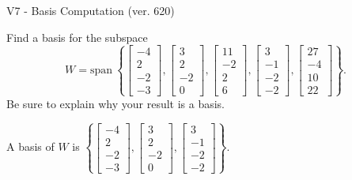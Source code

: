 \begin{exercise}
  \begin{exerciseTitle}V7 - Basis Computation (ver. 620)\end{exerciseTitle}
  \begin{exerciseStatement}
    Find a basis for the subspace 
\[W=\mathrm{span}\ \left\{\left[\begin{array}{r}
-4 \\
2 \\
-2 \\
-3
\end{array}\right] , \left[\begin{array}{r}
3 \\
2 \\
-2 \\
0
\end{array}\right] , \left[\begin{array}{r}
11 \\
-2 \\
2 \\
6
\end{array}\right] , \left[\begin{array}{r}
3 \\
-1 \\
-2 \\
-2
\end{array}\right] , \left[\begin{array}{r}
27 \\
-4 \\
10 \\
22
\end{array}\right]\right\}.\]
 Be sure to explain why your result is a basis.


  \end{exerciseStatement}
  \begin{exerciseAnswer}
   A basis of \(W\) is  \(\left\{\left[\begin{array}{r}
-4 \\
2 \\
-2 \\
-3
\end{array}\right] , \left[\begin{array}{r}
3 \\
2 \\
-2 \\
0
\end{array}\right] , \left[\begin{array}{r}
3 \\
-1 \\
-2 \\
-2
\end{array}\right]\right\}\).
  


  \end{exerciseAnswer}
\end{exercise}